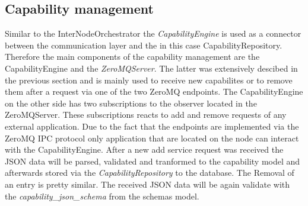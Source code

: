 \subsection{Capability management}
Similar to the InterNodeOrchestrator the \textit{CapabilityEngine} is used as a connector between the communication layer and the in this case CapabilityRepository.
Therefore the main components of the capability management are the CapabilityEngine and the \textit{ZeroMQServer}.
The latter was extensively descibed in the previous section and is mainly used to receive new capabilites or to remove them after a request via one of the two ZeroMQ endpoints.
The CapabilityEngine on the other side has two subscriptions to the observer located in the ZeroMQServer.
These subscriptions reacts to add and remove requests of any external application.
Due to the fact that the endpoints are implemented via the ZeroMQ \ac{IPC} protocol only application that are located on the node can interact with the CapabilityEngine.
After a new add service request was received the \ac{JSON} data will be parsed, validated and tranformed to the capability model and afterwards stored via the \textit{CapabilityRepository} to the database.
The Removal of an entry is pretty similar.
The received \ac{JSON} data will be again validate with the \textit{capability\_json\_schema} from the schemas model.


